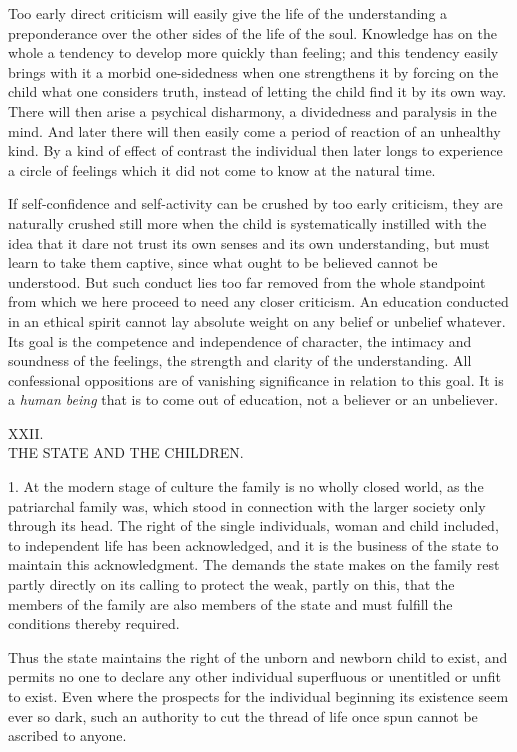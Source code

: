 \documentclass[12pt,a4paper,openany]{book}
\newcommand{\opage}[1]{\marginnote{\footnotesize\textit{[#1]}}}
\newcounter{etikch}
\newcommand{\chapterhead}[2]{\stepcounter{etikch}\bigskip\begin{center}\pdfbookmark[1]{#1 #2}{etikch.\arabic{etikch}}#1\\[3pt]{\large #2}\end{center}\medskip}
\begin{document}
Too early direct criticism will easily give the life of the understanding a preponderance over the other sides of the
life of the soul. Knowledge has on the whole a tendency to develop more quickly than feeling; and this tendency easily
brings with it a morbid one-sidedness when one strengthens it by forcing on the child what one considers truth, instead
of letting the child find it by its own way. There will then arise a psychical disharmony, a dividedness and paralysis in
the mind. And later there will then easily come a period of reaction of an unhealthy kind. By a kind of effect of
contrast the individual then later longs to experience a circle of feelings which it did not come to know at the
natural time.

If self-confidence and self-activity can be crushed by too early criticism, they are naturally crushed still more when
the child is systematically instilled with the idea that it dare not trust its own senses and its own understanding, but
must learn to take them captive, since what ought to be believed cannot be understood. But such conduct lies too far
removed from the whole standpoint from which we here proceed to need any closer criticism. An education conducted in an
ethical spirit cannot lay absolute weight on any belief or unbelief whatever. Its goal is the competence and independence
of character, the intimacy and soundness of the feelings, the strength and clarity of the understanding. All
confessional oppositions are of vanishing significance in relation to this goal. It is a \textit{human being} that is to
come out of education, not a believer or an unbeliever.

\opage{338}\chapterhead{XXII.}{THE STATE AND THE CHILDREN.}

1. At the modern stage of culture the family is no wholly closed world, as the patriarchal family was, which stood in
connection with the larger society only through its head. The right of the single individuals, woman and child included,
to independent life has been acknowledged, and it is the business of the state to maintain this acknowledgment. The
demands the state makes on the family rest partly directly on its calling to protect the weak, partly on this, that the
members of the family are also members of the state and must fulfill the conditions thereby required.

Thus the state maintains the right of the unborn and newborn child to exist, and permits no one to declare any other
individual superfluous or unentitled or unfit to exist. Even where the prospects for the individual beginning its
existence seem ever so dark, such an authority to cut the thread of life once spun cannot be ascribed to anyone.
\end{document}
